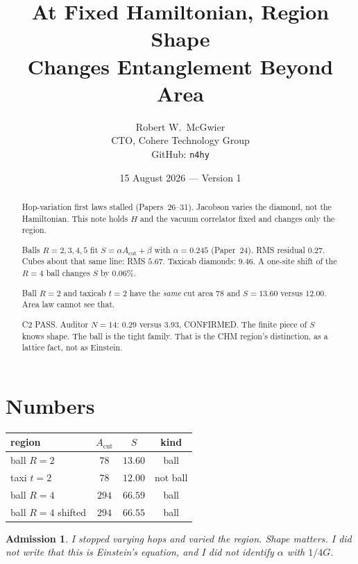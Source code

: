 \documentclass[11pt]{article}
\title{\textbf{At Fixed Hamiltonian, Region Shape\\
Changes Entanglement Beyond Area}}
\author{Robert W.\ McGwier\\
\small CTO, Cohere Technology Group\\
\small GitHub: \texttt{n4hy}}
\date{15 August 2026 --- Version 1}
\newtheorem*{admission}{Admission}
\begin{document}
\maketitle

\begin{abstract}
\noindent
Hop-variation first laws stalled (Papers~26--31). Jacobson varies
the diamond, not the Hamiltonian. This note holds $H$ and the
vacuum correlator fixed and changes only the region.

Balls $R=2,3,4,5$ fit $S=\alpha A_{\mathrm{cut}}+\beta$ with
$\alpha=0.245$ (Paper~24). RMS residual $0.27$. Cubes about that
same line: RMS $5.67$. Taxicab diamonds: $9.46$. A one-site shift
of the $R=4$ ball changes $S$ by $0.06\%$.

Ball $R=2$ and taxicab $t=2$ have the \emph{same} cut area $78$
and $S=13.60$ versus $12.00$. Area law cannot see that.

C2 PASS. Auditor $N=14$: $0.29$ versus $3.93$, CONFIRMED.
The finite piece of $S$ knows shape. The ball is the tight
family. That is the CHM region's distinction, as a lattice
fact, not as Einstein.
\end{abstract}

\section{Numbers}

\begin{center}
\begin{tabular}{lccc}
\hline
region & $A_{\mathrm{cut}}$ & $S$ & kind \\
\hline
ball $R=2$ & $78$ & $13.60$ & ball \\
taxi $t=2$ & $78$ & $12.00$ & not ball \\
ball $R=4$ & $294$ & $66.59$ & ball \\
ball $R=4$ shifted & $294$ & $66.55$ & ball \\
\hline
\end{tabular}
\end{center}

\begin{admission}
I stopped varying hops and varied the region. Shape matters.
I did not write that this is Einstein's equation, and I did
not identify $\alpha$ with $1/4G$.
\end{admission}
\end{document}
